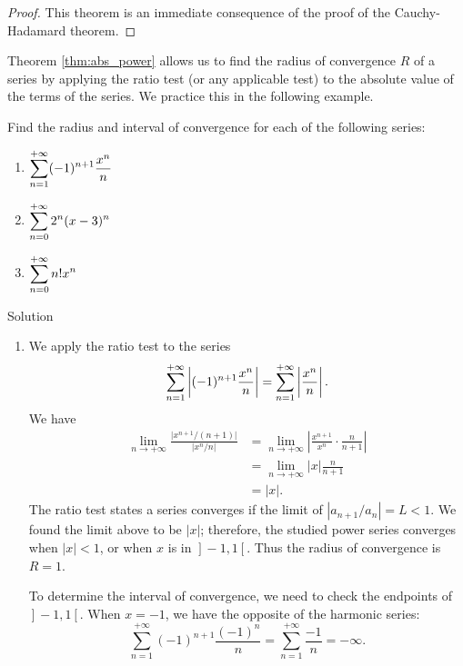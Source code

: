 \begin{proof}
This theorem is an immediate consequence of the proof of the Cauchy-Hadamard theorem. 
\end{proof}

\fi

Theorem \ref{thm:abs_power} allows us to find the radius of convergence $R$ of a series by applying the ratio test (or any applicable test) to the absolute value of the terms of the series. We practice this in the following example.


\begin{example}\label{ex_ps2}
Find the radius and interval of convergence for each of the following series:
\begin{multicols}{3}
\begin{enumerate}
\item $\displaystyle \sum_{n=1}^{+\infty} (-1)^{n+1}\frac{x^n}{n}$
\item $\displaystyle \sum_{n=0}^{+\infty} 2^n(x-3)^n$
\item $\displaystyle \sum_{n=0}^{+\infty} n!x^n$
\end{enumerate}
\end{multicols}

\pagebreak
{}Solution 

\begin{enumerate}
		
	\item		We apply the ratio test to the series $$\displaystyle \sum_{n=1}^{+\infty} \left|(-1)^{n+1}\frac{x^n}{n}\right| = \sum_{n=1}^{+\infty} \left|\frac{x^n}{n}\right|.$$ We have
	\begin{align*}
	\lim_{n\to+\infty} \frac{\big|x^{n+1}/(n+1)\big|}{\big|x^n/n\big|} &= \lim_{n\to+\infty} \left|\frac{x^{n+1}}{x^n}\cdot \frac{n}{n+1}\right| \\
			&= \lim_{n\to+\infty} |x|\frac{n}{n+1}\\
			&= |x|.
	\end{align*}
	The ratio test states a series converges if the limit of $|a_{n+1}/a_n| = L<1$. We found the limit above to be $|x|$; therefore, the studied power series converges when $|x| <1$, or when $x$ is in $\left.\right]-1,1\left[\right.$. Thus the radius of convergence is $R=1$.

	
	To determine the interval of convergence, we need to check the endpoints of $\left.\right]-1,1\left[\right.$. When $x=-1$, we have the opposite of the harmonic series:
	$$
	\sum_{n=1}^{+\infty} (-1)^{n+1}\frac{(-1)^n}{n} = \sum_{n=1}^{+\infty} \frac{-1}{n}= -\infty.$$


\end{enumerate}
\end{example}

